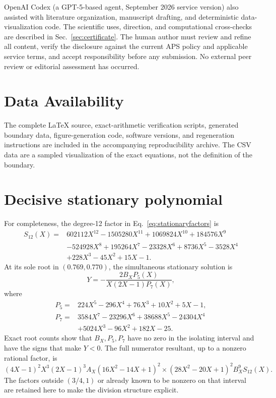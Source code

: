 \documentclass[aps,prb,preprint,superscriptaddress,nofootinbib]{revtex4-2}
\begin{document}
\begin{acknowledgments}
OpenAI Codex (a GPT-5-based agent, September 2026 service version) also
assisted with literature organization, manuscript drafting, and deterministic
data-visualization code.  The scientific uses, direction, and computational
cross-checks are described in Sec.~\ref{sec:certificate}.  The human author
must review and refine all content, verify the disclosure against the current
APS policy and applicable service terms, and accept responsibility before any
submission.  No external peer review or editorial assessment has occurred.
\end{acknowledgments}

\section*{Data Availability}

The complete LaTeX source, exact-arithmetic verification scripts, generated
boundary data, figure-generation code, software versions, and regeneration
instructions are included in the accompanying reproducibility archive.  The
CSV data are a sampled visualization of the exact equations, not the
definition of the boundary.

\appendix

\section{Decisive stationary polynomial}
\label{app:certificate}

For completeness, the degree-12 factor in
Eq.~\eqref{eq:stationaryfactors} is
\begin{align}
S_{12}(X)={}&602112X^{12}-1505280X^{11}+1069824X^{10}
+184576X^9\nonumber\\
&-524928X^8+195264X^7-23328X^6+8736X^5
-3528X^4\nonumber\\
&+228X^3-45X^2+15X-1.
\end{align}
At its sole root in $(0.769,0.770)$, the simultaneous stationary solution is
\begin{equation}
Y=-\frac{2B_XP_5(X)}{X(2X-1)P_7(X)},
\end{equation}
where
\begin{align}
P_5={}&224X^5-296X^4+76X^3+10X^2+5X-1,\\
P_7={}&3584X^7-23296X^6+38688X^5-24304X^4\nonumber\\
&+5024X^3-96X^2+182X-25.
\end{align}
Exact root counts show that $B_X,P_5,P_7$ have no zero in the isolating
interval and have the signs that make $Y<0$.  The full numerator resultant,
up to a nonzero rational factor, is
\begin{equation}
(4X-1)^2X^3(2X-1)^3A_X(16X^2-14X+1)^2
{}\times(28X^2-20X+1)^2B_X^9S_{12}(X).
\end{equation}
The factors outside $(3/4,1)$ or already known to be nonzero on that interval
are retained here to make the division structure explicit.
\end{document}
